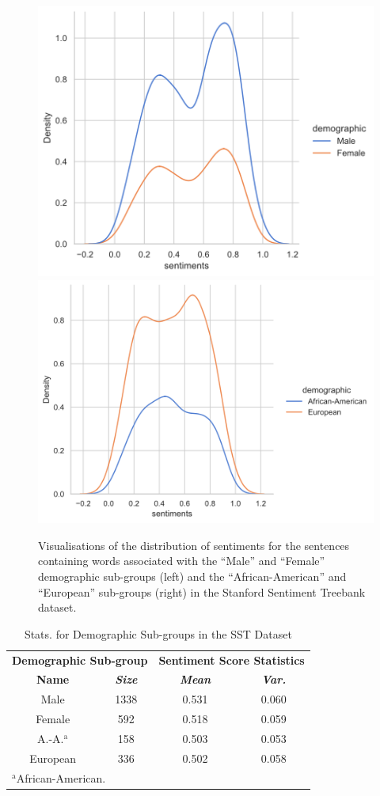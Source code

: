 \documentclass[a4paper]{IEEEtran}
\begin{document}
\begin{figure}[htbp]
\includegraphics[width=0.48\linewidth]{images/male-female-sentiments.png}
\includegraphics[width=0.48\linewidth]{images/aa-ee-sentiments.png}
\caption{Visualisations of the distribution of sentiments for the sentences containing words associated with the ``Male'' and ``Female'' demographic sub-groups (left) and the ``African-American'' and ``European'' sub-groups (right) in the Stanford Sentiment Treebank dataset.}
\label{fig:sentiments-dist}
\end{figure}

\begin{table}[htbp]
\caption{Stats. for Demographic Sub-groups in the SST Dataset}
\begin{center}
\begin{tabular}{|c|c|c|c|}
\hline
\multicolumn{2}{|c|}{\textbf{Demographic Sub-group}}&\multicolumn{2}{|c|}{\textbf{Sentiment Score Statistics}} \\
\cline{1-4} 
\textbf{Name} & \textbf{\textit{Size}}& \textbf{\textit{Mean}}& \textbf{\textit{Var.}} \\
\hline
Male & 1338 & 0.531 & 0.060 \\

Female & 592 & 0.518 & 0.059 \\
\hline
A.-A.$^{\mathrm{a}}$ & 158 & 0.503 & 0.053 \\

European & 336 & 0.502 & 0.058 \\

\hline
\multicolumn{4}{l}{$^{\mathrm{a}}$African-American.}
\end{tabular}
\label{stats-table}
\end{center}
\end{table}
\end{document}
